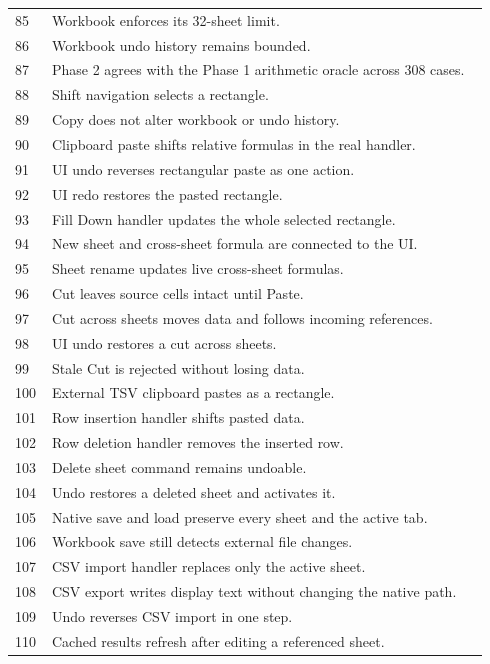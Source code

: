 \documentclass[11pt,letterpaper]{article}
\begin{document}
\begin{longtable}{@{}P{0.07\linewidth}P{0.87\linewidth}@{}}
85 & Workbook enforces its 32-sheet limit.\\
86 & Workbook undo history remains bounded.\\
87 & Phase 2 agrees with the Phase 1 arithmetic oracle across 308 cases.\\
88 & Shift navigation selects a rectangle.\\
89 & Copy does not alter workbook or undo history.\\
90 & Clipboard paste shifts relative formulas in the real handler.\\
91 & UI undo reverses rectangular paste as one action.\\
92 & UI redo restores the pasted rectangle.\\
93 & Fill Down handler updates the whole selected rectangle.\\
94 & New sheet and cross-sheet formula are connected to the UI.\\
95 & Sheet rename updates live cross-sheet formulas.\\
96 & Cut leaves source cells intact until Paste.\\
97 & Cut across sheets moves data and follows incoming references.\\
98 & UI undo restores a cut across sheets.\\
99 & Stale Cut is rejected without losing data.\\
100 & External TSV clipboard pastes as a rectangle.\\
101 & Row insertion handler shifts pasted data.\\
102 & Row deletion handler removes the inserted row.\\
103 & Delete sheet command remains undoable.\\
104 & Undo restores a deleted sheet and activates it.\\
105 & Native save and load preserve every sheet and the active tab.\\
106 & Workbook save still detects external file changes.\\
107 & CSV import handler replaces only the active sheet.\\
108 & CSV export writes display text without changing the native path.\\
109 & Undo reverses CSV import in one step.\\
110 & Cached results refresh after editing a referenced sheet.\\
\bottomrule\end{longtable}
\end{document}
